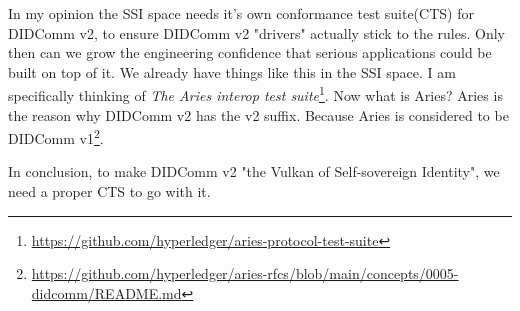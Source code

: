 In my opinion the SSI space needs it's own conformance test suite(CTS) for DIDComm v2, to ensure DIDComm v2 "drivers" actually stick to the rules. Only then can we grow the engineering confidence that serious applications could be built on top of it. We already have things like this in the SSI space. I am specifically thinking of \textit{The Aries interop test suite}\footnote{\url{https://github.com/hyperledger/aries-protocol-test-suite}}. Now what is Aries? Aries is the reason why DIDComm v2 has the v2 suffix. Because Aries is considered to be DIDComm v1\footnote{\url{https://github.com/hyperledger/aries-rfcs/blob/main/concepts/0005-didcomm/README.md}}.

In conclusion, to make DIDComm v2 "the Vulkan of Self-sovereign Identity", we need a proper CTS to go with it.